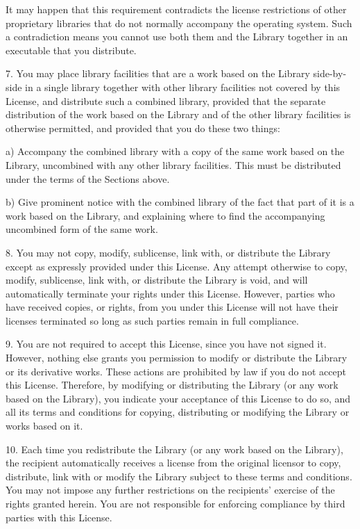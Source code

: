 It may happen that this requirement contradicts the license restrictions of
other proprietary libraries that do not normally accompany the operating
system.  Such a contradiction means you cannot use both them and the Library
together in an executable that you distribute.

7. You may place library facilities that are a work based on the Library
side-by-side in a single library together with other library facilities not
covered by this License, and distribute such a combined library, provided
that the separate distribution of the work based on the Library and of the
other library facilities is otherwise permitted, and provided that you do
these two things:

  a) Accompany the combined library with a copy of the same work based on the
  Library, uncombined with any other library facilities.  This must be
  distributed under the terms of the Sections above.

  b) Give prominent notice with the combined library of the fact that part of
  it is a work based on the Library, and explaining where to find the
  accompanying uncombined form of the same work.

8. You may not copy, modify, sublicense, link with, or distribute the Library
except as expressly provided under this License.  Any attempt otherwise to
copy, modify, sublicense, link with, or distribute the Library is void, and
will automatically terminate your rights under this License.  However,
parties who have received copies, or rights, from you under this License will
not have their licenses terminated so long as such parties remain in full
compliance.

9. You are not required to accept this License, since you have not signed it.
However, nothing else grants you permission to modify or distribute the
Library or its derivative works.  These actions are prohibited by law if you
do not accept this License.  Therefore, by modifying or distributing the
Library (or any work based on the Library), you indicate your acceptance of
this License to do so, and all its terms and conditions for copying,
distributing or modifying the Library or works based on it.

10. Each time you redistribute the Library (or any work based on the
Library), the recipient automatically receives a license from the original
licensor to copy, distribute, link with or modify the Library subject to
these terms and conditions.  You may not impose any further restrictions on
the recipients' exercise of the rights granted herein.  You are not
responsible for enforcing compliance by third parties with this License.

